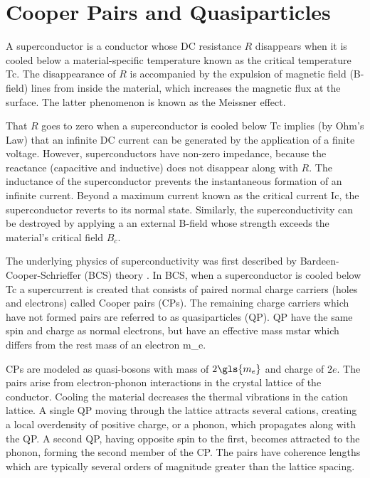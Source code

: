 \section{Cooper Pairs and Quasiparticles}\label{sec:supercond}

A superconductor is a conductor whose DC resistance $R$ disappears when it is cooled below a material-specific temperature known as the critical temperature \gls{Tc}. The disappearance of $R$ is accompanied by the expulsion of magnetic field (B-field) lines from inside the material, which increases the magnetic flux at the surface. The latter phenomenon is known as the Meissner effect.

That $R$ goes to zero when a superconductor is cooled below \gls{Tc} implies (by Ohm's Law) that an infinite DC current can be generated by the application of a finite voltage. However, superconductors have non-zero impedance, because the reactance (capacitive and inductive) does not disappear along with $R$. The inductance of the superconductor prevents the instantaneous formation of an infinite current. Beyond a maximum current known as the critical current \gls{Ic}, the superconductor reverts to its normal state. Similarly, the superconductivity can be destroyed by applying a an external B-field whose strength exceeds the material's critical field $B_{c}$.

The underlying physics of superconductivity was first described by Bardeen-Cooper-Schrieffer (BCS) theory \citep{bardeen1957theory}. In BCS, when a superconductor is cooled below \gls{Tc} a supercurrent is created that consists of paired normal charge carriers (holes and electrons) called Cooper pairs (CPs). The remaining charge carriers which have not formed pairs are referred to as quasiparticles (QP). QP have the same spin and charge as normal electrons, but have an effective mass \gls{mstar} which differs from the rest mass of an electron \gls{m_e}.

CPs are modeled as quasi-bosons with mass of $2\gls{m_e}$ and charge of $2e$. The pairs arise from electron-phonon interactions in the crystal lattice of the conductor. Cooling the material decreases the thermal vibrations in the cation lattice. A single QP moving through the lattice attracts several cations, creating a local overdensity of positive charge, or a phonon, which propagates along with the QP. A second QP, having opposite spin to the first, becomes attracted to the phonon, forming the second member of the CP. The pairs have coherence lengths which are typically several orders of magnitude greater than the lattice spacing.

